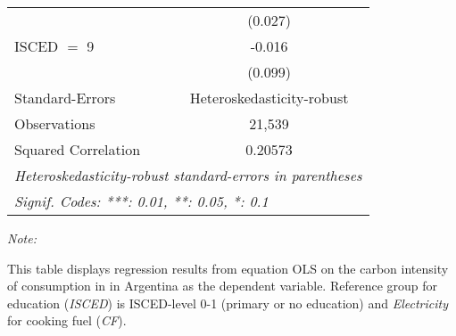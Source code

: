 \begin{table}[htbp!]
\begin{adjustbox}{width = 1\textwidth, max height = 0.95\textheight, center}
\begin{threeparttable}[b]
\begin{tabular}{lc}
                                & (0.027)\\   
            ISCED $=$ 9         & -0.016\\   
                                & (0.099)\\   
            \midrule 
            Standard-Errors     & Heteroskedasticity-robust \\   
            Observations        & 21,539\\  
            Squared Correlation & 0.20573\\  
            \midrule \midrule
            \multicolumn{2}{l}{\emph{Heteroskedasticity-robust standard-errors in parentheses}}\\
            \multicolumn{2}{l}{\emph{Signif. Codes: ***: 0.01, **: 0.05, *: 0.1}}\\
         \end{tabular}
         
         \begin{tablenotes}\item \medskip \textit{Note:}
            \item This table displays regression results from equation OLS on the carbon intensity of consumption in  in Argentina as the dependent variable. Reference group for education (\textit{ISCED}) is ISCED-level 0-1 (primary or no education) and \textit{Electricity} for cooking fuel (\textit{CF}).
         \end{tablenotes}
      \end{threeparttable}
   \end{adjustbox}
\end{table}


